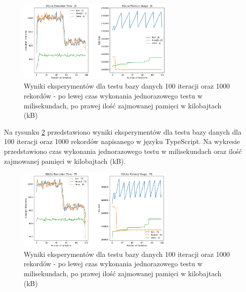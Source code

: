 \begin{figure}[H]
  \centering
  \includegraphics[width=0.68\textwidth]{Figures/database/sqlite_100_1000_js.png}
  \caption{Wyniki eksperymentów dla testu bazy danych 100 iteracji oraz 1000 rekordów - po lewej czas wykonania jednorazowego testu w milisekundach, po prawej ilość zajmowanej pamięci w kilobajtach (kB)}
  \label{fig:database_e2_js}
\end{figure}

Na rysunku \ref{fig:database_e2_ts} przedstawiono wyniki eksperymentów dla testu bazy danych dla 100 iteracji oraz 1000 rekordów napisanego w języku TypeScript. Na wykresie przedstawiono czas wykonania jednorazowego testu w milisekundach oraz ilość zajmowanej pamięci w kilobajtach (kB).

\begin{figure}[H]
  \centering
  \includegraphics[width=0.68\textwidth]{Figures/database/sqlite_100_1000_ts.png}
  \caption{Wyniki eksperymentów dla testu bazy danych 100 iteracji oraz 1000 rekordów - po lewej czas wykonania jednorazowego testu w milisekundach, po prawej ilość zajmowanej pamięci w kilobajtach (kB)}
  \label{fig:database_e2_ts}
\end{figure}